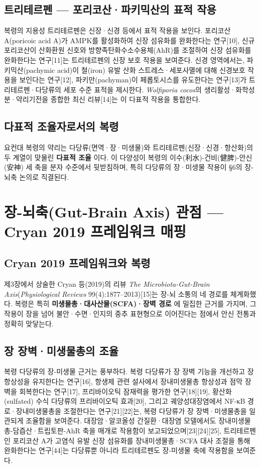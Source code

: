 \documentclass[11pt,oneside]{book}
\begin{document}
\subsection{트리테르펜 — 포리코산·파키믹산의 표적 작용}
복령의 지용성 트리테르펜은 신장·신경 등에서 표적 작용을 보인다. 포리코산 A(poricoic acid A)가 AMPK를 활성화하여 신장 섬유화를 완화한다는 연구[10], 신규 포리코산이 산화환원 신호와 방향족탄화수소수용체(AhR)를 조절하여 신장 섬유화를 완화한다는 연구[11]는 트리테르펜의 신장 보호 작용을 보여준다. 신경 영역에서는, 파키믹산(pachymic acid)이 철(iron) 유발 산화 스트레스·세포사멸에 대해 신경보호 작용을 보인다는 연구[12], 파키만(pachyman)이 페롭토시스를 유도한다는 연구[13]가 트리테르펜·다당류의 세포 수준 표적을 제시한다. \textit{Wolfiporia cocos}의 생리활성·화학성분·약리기전을 종합한 최신 리뷰[14]는 이 다표적 작용을 통합한다.

\subsection{다표적 조율자로서의 복령}
요컨대 복령의 약리는 다당류(면역·장·미생물)와 트리테르펜(신장·신경·항산화)의 두 계열이 맞물린 \textbf{다표적 조율} 이다. 이 다양성이 복령의 이수(利水)-건비(健脾)-안신(安神) 세 축을 분자 수준에서 뒷받침하며, 특히 다당류의 장·미생물 작용이 §6의 장-뇌축 논의로 직결된다.

\section{장-뇌축(Gut-Brain Axis) 관점 — Cryan 2019 프레임워크 매핑}
\subsection{Cryan 2019 프레임워크와 복령}
제3장에서 상술한 Cryan 등(2019)의 리뷰 \textit{The Microbiota-Gut-Brain Axis}(\textit{Physiological Reviews} 99(4):1877–2013)[15]는 장-뇌 소통의 네 경로를 체계화했다. 복령은 특히 \textbf{미생물총·대사산물(SCFA)·장벽 경로} 에 밀집한 근거를 가지며, 그 작용이 장을 넘어 불안·수면·인지의 중추 표현형으로 이어진다는 점에서 안신 전통과 정확히 맞닿는다.

\subsection{장 장벽·미생물총의 조율}
복령 다당류의 장-미생물 근거는 풍부하다. 복령 다당류가 장 장벽 기능을 개선하고 장 항상성을 유지한다는 연구[16], 항생제 관련 설사에서 장내미생물총 항상성과 점막 장벽을 회복한다는 연구[17], 프리바이오틱 잠재력을 평가한 연구[18][19], 황산화(sulfated) 수식 다당류의 프리바이오틱 효과[20], 그리고 궤양성대장염에서 NF-κB 경로·장내미생물총을 조절한다는 연구[21][22]는, 복령 다당류가 장 장벽·미생물총을 일관되게 조율함을 보여준다. 대장암·알코올성 간질환·대장염 모델에서도 장내미생물총-담즙산·트립토판-AhR 축을 매개로 작용함이 보고되었으며[23][24][25], 트리테르펜인 포리코산 A가 고염식 유발 신장 섬유화를 장내미생물총·SCFA 대사 조절을 통해 완화한다는 연구[44]는 다당류뿐 아니라 트리테르펜도 장-미생물 축에 작용함을 보여준다.
\end{document}
